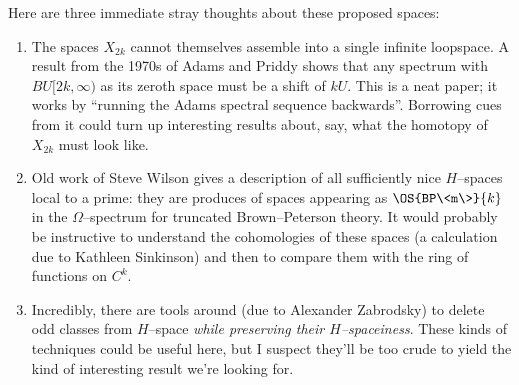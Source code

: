 Here are three immediate stray thoughts about these proposed spaces:
\begin{enumerate}
\item The spaces $X_{2k}$ cannot themselves assemble into a single infinite loopspace. A result from the 1970s of Adams and Priddy shows that any spectrum with $BU[2k, \infty)$ as its zeroth space must be a shift of $kU$.  This is a neat paper; it works by ``running the Adams spectral sequence backwards''.  Borrowing cues from it could turn up interesting results about, say, what the homotopy of $X_{2k}$ must look like.
\item Old work of Steve Wilson gives a description of all sufficiently nice $H$--spaces local to a prime: they are produces of spaces appearing as $\OS{BP\<m\>}{k}$ in the $\Omega$--spectrum for truncated Brown--Peterson theory.  It would probably be instructive to understand the cohomologies of these spaces (a calculation due to Kathleen Sinkinson) and then to compare them with the ring of functions on $C^k$.
\item Incredibly, there are tools around (due to Alexander Zabrodsky) to delete odd classes from $H$--space \emph{while preserving their $H$--spaceiness}.  These kinds of techniques could be useful here, but I suspect they'll be too crude to yield the kind of interesting result we're looking for.
\end{enumerate}







\newpage

